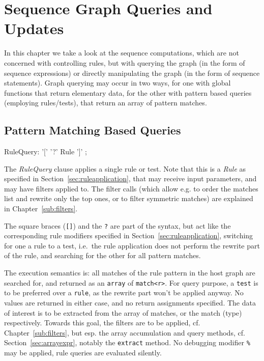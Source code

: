 \chapter{Sequence Graph Queries and Updates}\label{cha:graphquery}%

In this chapter we take a look at the sequence computations, which are not concerned with controlling rules, but with querying the graph (in the form of sequence expressions) or directly manipulating the graph (in the form of sequence statements).
Graph querying may occur in two ways, for one with global functions that return elementary data, for the other with pattern based queries (employing rules/tests), that return an array of pattern matches.

\section{Pattern Matching Based Queries}\label{sec:patternbasedgraphquery}

\begin{rail}
  RuleQuery: '[' '?' Rule ']' ;
\end{rail}

The \emph{RuleQuery} clause applies a single rule or test.
Note that this is a \emph{Rule} as specified in Section~\ref{sec:ruleapplication}, that may receive input parameters, and may have filters applied to.
The filter calls (which allow e.g. to order the matches list and rewrite only the top ones, or to filter symmetric matches) are explained in Chapter~\ref{sub:filters}.

The square braces (\texttt{[]}) and the \texttt{?} are part of the syntax, but act like the corresponding rule modifiers specified in Section~\ref{sec:ruleapplication}, switching for one a rule to a test, i.e.\ the rule application does not perform the rewrite part of the rule, and searching for the other for all pattern matches.

The execution semantics is: all matches of the rule pattern in the host graph are searched for, and returned as an \texttt{array} of \texttt{match<r>}.
For query purpose, a \texttt{test} is to be preferred over a \texttt{rule}, as the rewrite part won't be applied anyway. 
No values are returned in either case, and no return assignments specified.
The data of interest is to be extracted from the array of matches, or the match (type) respectively.
Towards this goal, the filters are to be applied, cf. Chapter~\ref{sub:filters}, but esp. the array accumulation and query methods, cf. Section~\ref{sec:arrayexpr}, notably the \texttt{extract} method.
No debugging modifier \texttt{\%} may be applied, rule queries are evaluated silently.

